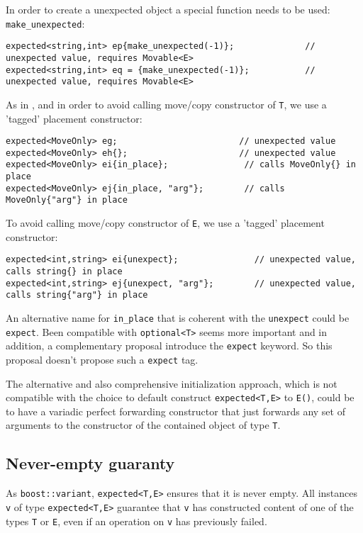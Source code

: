\documentclass[a4paper,10pt]{article}
\newcommand{\cpp}[1]{\lstinline{#1}}
\begin{document}
In order to create a unexpected object a special function needs to be used: \cpp{make_unexpected}:

\begin{lstlisting}
expected<string,int> ep{make_unexpected(-1)};              // unexpected value, requires Movable<E>
expected<string,int> eq = {make_unexpected(-1)};           // unexpected value, requires Movable<E>
\end{lstlisting}

As in \cite{OptionalRev4}, and in order to avoid calling move/copy constructor of \cpp{T}, we use a 'tagged' placement constructor: 

\begin{lstlisting}
expected<MoveOnly> eg;                        // unexpected value
expected<MoveOnly> eh{};                      // unexpected value
expected<MoveOnly> ei{in_place};               // calls MoveOnly{} in place
expected<MoveOnly> ej{in_place, "arg"};        // calls MoveOnly{"arg"} in place
\end{lstlisting}

To avoid calling move/copy constructor of \cpp{E}, we use a 'tagged' placement constructor: 

\begin{lstlisting}
expected<int,string> ei{unexpect};               // unexpected value, calls string{} in place
expected<int,string> ej{unexpect, "arg"};        // unexpected value, calls string{"arg"} in place
\end{lstlisting}

An alternative name for \cpp{in_place} that is coherent with the \cpp{unexpect} could be \cpp{expect}. Been compatible with \cpp{optional<T>} seems more important and in addition, a complementary proposal introduce the \cpp{expect} keyword. So this proposal doesn't propose such a \cpp{expect} tag.

The alternative and also comprehensive initialization approach, which is not compatible with the choice to default construct \cpp{expected<T,E>} to \cpp{E()}, could be to have a variadic perfect forwarding constructor that just forwards any set of arguments to the constructor of the contained object of type \cpp{T}. 
 
\subsection{Never-empty guaranty}

As \cpp{boost::variant}, \cpp{expected<T,E>} ensures that it is never empty.
All instances \cpp{v} of type \cpp{expected<T,E>} guarantee that \cpp{v} has constructed content of one of the types \cpp{T} or \cpp{E}, even if an operation on \cpp{v} has previously failed.
\end{document}
